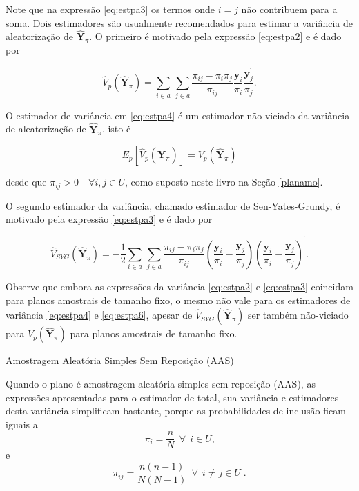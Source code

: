 \documentclass[]{book}
\theoremstyle{definition}
\theoremstyle{definition}
\theoremstyle{definition}
\theoremstyle{remark}
\let\BeginKnitrBlock\begin \let\EndKnitrBlock\end
\begin{document}
Note que na expressão \eqref{eq:estpa3} os termos onde \(i=j\) não
contribuem para a soma. Dois estimadores são usualmente recomendados
para estimar a variância de aleatorização de \(\mathbf{\hat{Y}}_{\pi}\).
O primeiro é motivado pela expressão \eqref{eq:estpa2} e é dado por

\begin{equation}
\hat{V}_p \left( \mathbf{\hat{Y}}_{\pi} \right) = \sum_{i \in a} \, \sum_{j \in a} \frac{\pi_{ij} - \pi_i \pi_j} {\pi_{ij}} \frac{\mathbf{y}_i} {\pi_i} \frac{\mathbf{y}_j^{^{\prime}}} {\pi_j} \mbox{.}  \label{eq:estpa4}
\end{equation}

O estimador de variância em \eqref{eq:estpa4} é um estimador não-viciado
da variância de aleatorização de \(\mathbf{\hat{Y}}_{\pi}\), isto é

\begin{equation}
E_p \left[ \hat{V}_p \left( \mathbf{\hat{Y}}_{\pi} \right) \right] = V_p \left( \mathbf{\hat{Y}}_{\pi} \right) \label{eq:estpa5}
\end{equation}

desde que \(\pi _{ij} > 0 \quad \forall i,j \in U\), como suposto neste
livro na Seção \ref{planamo}.

O segundo estimador da variância, chamado estimador de Sen-Yates-Grundy,
é motivado pela expressão \eqref{eq:estpa3} e é dado por

\begin{equation}
\hat{V}_{SYG} \left( \mathbf{\hat{Y}}_{\pi} \right) = - \frac{1}{2} \sum_{i \in a} \, \sum_{j \in a} \frac{\pi _{ij} - \pi_i \pi_j} {\pi_{ij}} \left( \frac{
\mathbf{y}_i} {\pi_i} - \frac{\mathbf{y}_j} {\pi_j} \right) \left( 
\frac{\mathbf{y}_i} {\pi_i} - \frac{\mathbf{y}_j} {\pi_j} \right)^{^{\prime }}.  \label{eq:estpa6}
\end{equation}

Observe que embora as expressões da variância \eqref{eq:estpa2} e
\eqref{eq:estpa3} coincidam para planos amostrais de tamanho fixo, o mesmo
não vale para os estimadores de variância \eqref{eq:estpa4} e
\eqref{eq:estpa6}, apesar de
\(\hat{V}_{SYG} \left( \mathbf{\hat{Y}}_{\pi} \right)\) ser também
não-viciado para \(V_{p} \left( \mathbf{\hat{Y}}_{\pi} \right)\) para
planos amostrais de tamanho fixo.

\BeginKnitrBlock{example}
\protect\hypertarget{exm:exe31}{}{\label{exm:exe31} }Amostragem Aleatória
Simples Sem Reposição (AAS)
\EndKnitrBlock{example}

Quando o plano é amostragem aleatória simples sem reposição (AAS), as
expressões apresentadas para o estimador de total, sua variância e
estimadores desta variância simplificam bastante, porque as
probabilidades de inclusão ficam iguais a \[
\pi_i = \frac{n}{N}\ \ \forall \ \ i \in U \mbox{,} 
\] e \[
\pi_{ij} = \frac{n(n-1)}{N(N-1)}\ \ \forall \ \ i \neq j \in U\;. 
\]
\end{document}
